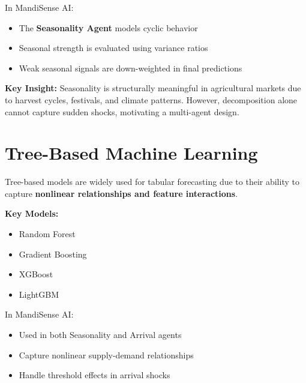 \documentclass[12pt,a4paper]{report}
\begin{document}
\noindent
In MandiSense AI:
\begin{itemize}
    \item The \textbf{Seasonality Agent} models cyclic behavior
    \item Seasonal strength is evaluated using variance ratios
    \item Weak seasonal signals are down-weighted in final predictions
\end{itemize}

\vspace{0.4em}

\noindent
\textbf{Key Insight:}  
Seasonality is structurally meaningful in agricultural markets due to harvest cycles, festivals, and climate patterns. However, decomposition alone cannot capture sudden shocks, motivating a multi-agent design.

\vspace{0.7em}


\section{Tree-Based Machine Learning}

\noindent
Tree-based models are widely used for tabular forecasting due to their ability to capture \textbf{nonlinear relationships and feature interactions}.

\vspace{0.4em}

\noindent
\textbf{Key Models:}
\begin{itemize}
    \item Random Forest \cite{breiman2001}
    \item Gradient Boosting \cite{friedman2001}
    \item XGBoost \cite{chen2016}
    \item LightGBM \cite{ke2017}
\end{itemize}

\vspace{0.4em}

\noindent
In MandiSense AI:
\begin{itemize}
    \item Used in both Seasonality and Arrival agents
    \item Capture nonlinear supply-demand relationships
    \item Handle threshold effects in arrival shocks
\end{itemize}
\end{document}
